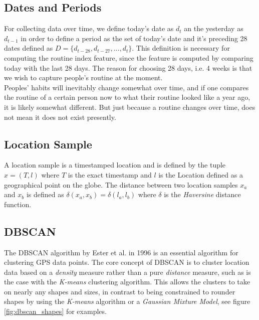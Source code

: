 \subsection{Dates and Periods}
For collecting data over time, we define today's date as $d_t$ an the yesterday as $d_{t-1}$ in order to define a period as the set of today's date and it's preceding 28 dates defined as $D = \{d_{t-28}, d_{t-27}, ..., d_{t}\}$. This definition is necessary for computing the routine index feature, since the feature is computed by comparing today with the last 28 days. The reason for choosing 28 days, i.e. 4 weeks is that we wish to capture people's routine at the moment. \\

Peoples' habits will inevitably change somewhat over time, and if one compares the routine of a certain person now to what their routine looked like a year ago, it is likely somewhat different. But just because a routine changes over time, does not mean it does not exist presently.

\subsection{Location Sample}
A location sample is a timestamped location and is defined by the tuple $x = (T, l)$ where $T$ is the exact timestamp and $l$ is the Location defined as a geographical point on the globe. The distance between two location samples $x_a$ and $x_b$ is defined as $\delta(x_a, x_b) = \delta(l_a, l_b)$ where $\delta$ is the \textit{Haversine} distance function.


\subsection{DBSCAN}
The DBSCAN algorithm by Ester et al. in 1996 \cite{density-based-1996} is an essential algorithm for clustering GPS data points. The core concept of DBSCAN is to cluster location data based on a \textit{density} measure rather than a pure \textit{distance} measure, such as is the case with the \textit{K-means} clustering algorithm. This allows the clusters to take on nearly any shapes and sizes, in contrast to being constrained to rounder shapes by using the \textit{K-means} algorithm or a \textit{Gaussian Mixture Model}, see figure \ref{fig:dbscan_shapes} for examples.\\

